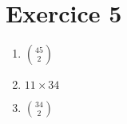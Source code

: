\part{Exercice 5}

\begin{enumerate}
	\item ${45\choose 2}$ 
	\item $11 \times 34$ 
	\item ${34\choose 2}$
\end{enumerate}

